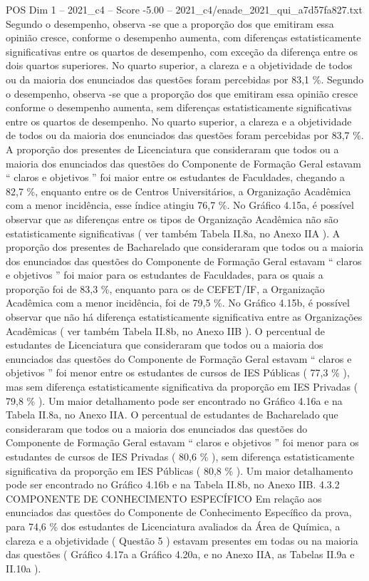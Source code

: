 \begin{textsample}{POS Dim 1 – 2021\_c4 – Score -5.00 – 2021\_c4/enade\_2021\_qui\_a7d57fa827.txt}
Segundo o desempenho, observa -se que a proporção dos que emitiram essa opinião cresce, conforme o desempenho aumenta, com diferenças estatisticamente significativas entre os quartos de desempenho, com exceção da diferença entre os dois quartos superiores.
No quarto superior, a clareza e a objetividade de todos ou da maioria dos enunciados das questões foram percebidas por 83,1 \%.
Segundo o desempenho, observa -se que a proporção dos que emitiram essa opinião cresce conforme o desempenho aumenta, sem diferenças estatisticamente significativas entre os quartos de desempenho.
No quarto superior, a clareza e a objetividade de todos ou da maioria dos enunciados das questões foram percebidas por 83,7 \%.
A proporção dos presentes de Licenciatura que consideraram que todos ou a maioria dos enunciados das questões do Componente de Formação Geral estavam “ claros e objetivos ” foi maior entre os estudantes de Faculdades, chegando a 82,7 \%, enquanto entre os de Centros Universitários, a Organização Acadêmica com a menor incidência, esse índice atingiu 76,7 \%.
No Gráfico 4.15a, é possível observar que as diferenças entre os tipos de Organização Acadêmica não são estatisticamente significativas ( ver também Tabela II.8a, no Anexo IIA ).
A proporção dos presentes de Bacharelado que consideraram que todos ou a maioria dos enunciados das questões do Componente de Formação Geral estavam “ claros e objetivos ” foi maior para os estudantes de Faculdades, para os quais a proporção foi de 83,3 \%, enquanto para os de CEFET/IF, a Organização Acadêmica com a menor incidência, foi de 79,5 \%.
No Gráfico 4.15b, é possível observar que não há diferença estatisticamente significativa entre as Organizações Acadêmicas ( ver também Tabela II.8b, no Anexo IIB ).
O percentual de estudantes de Licenciatura que consideraram que todos ou a maioria dos enunciados das questões do Componente de Formação Geral estavam “ claros e objetivos ” foi menor entre os estudantes de cursos de IES Públicas ( 77,3 \% ), mas sem diferença estatisticamente significativa da proporção em IES Privadas ( 79,8 \% ).
Um maior detalhamento pode ser encontrado no Gráfico 4.16a e na Tabela II.8a, no Anexo IIA.
O percentual de estudantes de Bacharelado que consideraram que todos ou a maioria dos enunciados das questões do Componente de Formação Geral estavam “ claros e objetivos ” foi menor para os estudantes de cursos de IES Privadas ( 80,6 \% ), sem diferença estatisticamente significativa da proporção em IES Públicas ( 80,8 \% ).
Um maior detalhamento pode ser encontrado no Gráfico 4.16b e na Tabela II.8b, no Anexo IIB. 4.3.2 COMPONENTE DE CONHECIMENTO ESPECÍFICO Em relação aos enunciados das questões do Componente de Conhecimento Específico da prova, para 74,6 \% dos estudantes de Licenciatura avaliados da Área de Química, a clareza e a objetividade ( Questão 5 ) estavam presentes em todas ou na maioria das questões ( Gráfico 4.17a a Gráfico 4.20a, e no Anexo IIA, as Tabelas II.9a e II.10a ).

\end{textsample}
